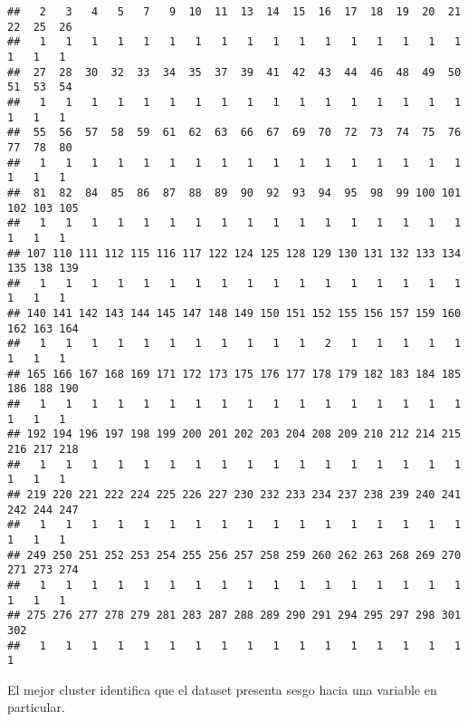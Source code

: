\documentclass[
]{article}
\newenvironment{Shaded}{\begin{snugshade}}{\end{snugshade}}
\newcommand{\AttributeTok}[1]{\textcolor[rgb]{0.77,0.63,0.00}{#1}}
\newcommand{\DecValTok}[1]{\textcolor[rgb]{0.00,0.00,0.81}{#1}}
\newcommand{\FunctionTok}[1]{\textcolor[rgb]{0.00,0.00,0.00}{#1}}
\newcommand{\NormalTok}[1]{#1}
\newcommand{\OtherTok}[1]{\textcolor[rgb]{0.56,0.35,0.01}{#1}}
\newcommand{\SpecialCharTok}[1]{\textcolor[rgb]{0.00,0.00,0.00}{#1}}
\begin{document}
\begin{verbatim}
##   2   3   4   5   7   9  10  11  13  14  15  16  17  18  19  20  21  22  25  26 
##   1   1   1   1   1   1   1   1   1   1   1   1   1   1   1   1   1   1   1   1 
##  27  28  30  32  33  34  35  37  39  41  42  43  44  46  48  49  50  51  53  54 
##   1   1   1   1   1   1   1   1   1   1   1   1   1   1   1   1   1   1   1   1 
##  55  56  57  58  59  61  62  63  66  67  69  70  72  73  74  75  76  77  78  80 
##   1   1   1   1   1   1   1   1   1   1   1   1   1   1   1   1   1   1   1   1 
##  81  82  84  85  86  87  88  89  90  92  93  94  95  98  99 100 101 102 103 105 
##   1   1   1   1   1   1   1   1   1   1   1   1   1   1   1   1   1   1   1   1 
## 107 110 111 112 115 116 117 122 124 125 128 129 130 131 132 133 134 135 138 139 
##   1   1   1   1   1   1   1   1   1   1   1   1   1   1   1   1   1   1   1   1 
## 140 141 142 143 144 145 147 148 149 150 151 152 155 156 157 159 160 162 163 164 
##   1   1   1   1   1   1   1   1   1   1   1   2   1   1   1   1   1   1   1   1 
## 165 166 167 168 169 171 172 173 175 176 177 178 179 182 183 184 185 186 188 190 
##   1   1   1   1   1   1   1   1   1   1   1   1   1   1   1   1   1   1   1   1 
## 192 194 196 197 198 199 200 201 202 203 204 208 209 210 212 214 215 216 217 218 
##   1   1   1   1   1   1   1   1   1   1   1   1   1   1   1   1   1   1   1   1 
## 219 220 221 222 224 225 226 227 230 232 233 234 237 238 239 240 241 242 244 247 
##   1   1   1   1   1   1   1   1   1   1   1   1   1   1   1   1   1   1   1   1 
## 249 250 251 252 253 254 255 256 257 258 259 260 262 263 268 269 270 271 273 274 
##   1   1   1   1   1   1   1   1   1   1   1   1   1   1   1   1   1   1   1   1 
## 275 276 277 278 279 281 283 287 288 289 290 291 294 295 297 298 301 302 
##   1   1   1   1   1   1   1   1   1   1   1   1   1   1   1   1   1   1
\end{verbatim}

El mejor cluster identifica que el dataset presenta sesgo hacia una
variable en particular.

\begin{Shaded}
\end{Shaded}
\end{document}
